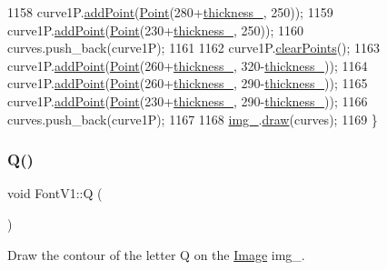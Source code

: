 \begin{DoxyCode}
1158     curve1P.\mbox{\hyperlink{class_bezier_curve_a38d16c18b36ae45619b05e26e226cf34}{addPoint}}(\mbox{\hyperlink{class_point}{Point}}(280+\mbox{\hyperlink{class_font_v1_aed8040e76be9a52833627b92f0fb4e5f}{thickness\_}}, 250));
1159     curve1P.\mbox{\hyperlink{class_bezier_curve_a38d16c18b36ae45619b05e26e226cf34}{addPoint}}(\mbox{\hyperlink{class_point}{Point}}(230+\mbox{\hyperlink{class_font_v1_aed8040e76be9a52833627b92f0fb4e5f}{thickness\_}}, 250));
1160     curves.push\_back(curve1P);
1161 
1162     curve1P.\mbox{\hyperlink{class_bezier_curve_a0ba8ce66d5af5971ae6a1b506029728e}{clearPoints}}();
1163     curve1P.\mbox{\hyperlink{class_bezier_curve_a38d16c18b36ae45619b05e26e226cf34}{addPoint}}(\mbox{\hyperlink{class_point}{Point}}(260+\mbox{\hyperlink{class_font_v1_aed8040e76be9a52833627b92f0fb4e5f}{thickness\_}}, 320-\mbox{\hyperlink{class_font_v1_aed8040e76be9a52833627b92f0fb4e5f}{thickness\_}}));
1164     curve1P.\mbox{\hyperlink{class_bezier_curve_a38d16c18b36ae45619b05e26e226cf34}{addPoint}}(\mbox{\hyperlink{class_point}{Point}}(260+\mbox{\hyperlink{class_font_v1_aed8040e76be9a52833627b92f0fb4e5f}{thickness\_}}, 290-\mbox{\hyperlink{class_font_v1_aed8040e76be9a52833627b92f0fb4e5f}{thickness\_}}));
1165     curve1P.\mbox{\hyperlink{class_bezier_curve_a38d16c18b36ae45619b05e26e226cf34}{addPoint}}(\mbox{\hyperlink{class_point}{Point}}(230+\mbox{\hyperlink{class_font_v1_aed8040e76be9a52833627b92f0fb4e5f}{thickness\_}}, 290-\mbox{\hyperlink{class_font_v1_aed8040e76be9a52833627b92f0fb4e5f}{thickness\_}}));
1166     curves.push\_back(curve1P);
1167 
1168     \mbox{\hyperlink{class_font_v1_a00569e3e3c4b70f437b63f396f735fb0}{img\_}}.\mbox{\hyperlink{class_image_a8d162f3cab956131d58708c09aa560b0}{draw}}(curves);
1169 \}
\end{DoxyCode}
\mbox{\label{class_font_v1_af7ffd76bf02756d0d1e2d3eab4c65c40}} 
\subsubsection{\texorpdfstring{Q()}{Q()}}
{\footnotesize\ttfamily void Font\+V1\+::Q (\begin{DoxyParamCaption}{ }\end{DoxyParamCaption})}



Draw the contour of the letter Q on the \mbox{\hyperlink{class_image}{Image}} img\+\_\+. 


